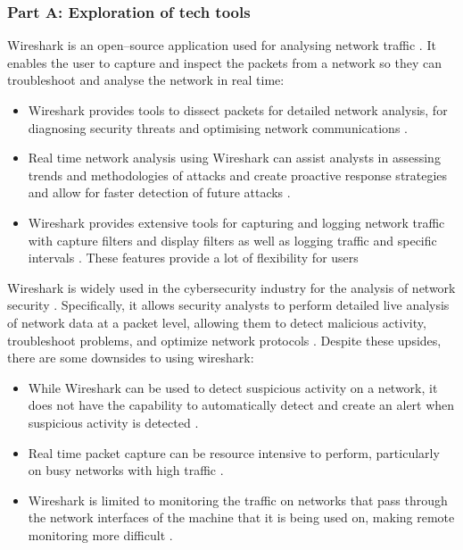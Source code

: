 \documentclass[a4paper, 11pt]{report}
\begin{document}
\subsubsection{Part A: Exploration of tech tools}

Wireshark is an open–source application used for analysing network traffic \cite{soepeno2023}. It enables the user to capture and inspect the packets from a network so they can troubleshoot and analyse the network in real time:

\begin{itemize}

	\item Wireshark provides tools to dissect packets for detailed network analysis, for diagnosing security threats and optimising network communications \cite{soepeno2023}.

	\item Real time network analysis using Wireshark can assist analysts in assessing trends and methodologies of attacks and create proactive response strategies and allow for faster detection of future attacks \cite{soepeno2023}.

	\item Wireshark provides extensive tools for capturing and logging network traffic with capture filters and display filters as well as logging traffic and specific intervals \cite{banerjee2010}. These features provide a lot of flexibility for users

\end{itemize}

Wireshark is widely used in the cybersecurity industry for the analysis of network security \cite{soepeno2023}. Specifically, it allows security analysts to perform detailed live analysis of network data at a packet level, allowing them to detect malicious activity, troubleshoot problems, and optimize network protocols \cite{banerjee2010}. Despite these upsides, there are some downsides to using wireshark:

\begin{itemize}

	\item While Wireshark can be used to detect suspicious activity on a network, it does not have the capability to automatically detect and create an alert when suspicious activity is detected \cite{mabsali2023}.

	\item Real time packet capture can be resource intensive to perform, particularly on busy networks with high traffic \cite{alizan2024}.

	\item Wireshark is limited to monitoring the traffic on networks that pass through the network interfaces of the machine that it is being used on, making remote monitoring more difficult \cite{alizan2024}.

\end{itemize}
\end{document}
